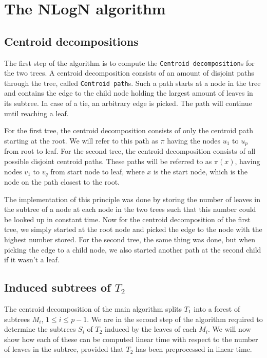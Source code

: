 \chapter{The NLogN algorithm}

\section{Centroid decompositions}
The first step of the algorithm is to compute the \texttt{Centroid decomposition}s for the two trees. A centroid decomposition consists of an amount of disjoint paths through the tree, called \texttt{Centroid path}s. Such a path starts at a node in the tree and contains the edge to the child node holding the largest amount of leaves in its subtree. In case of a tie, an arbitrary edge is picked. The path will continue until reaching a leaf.

For the first tree, the centroid decomposition consists of only the centroid path starting at the root. We will refer to this path as $\pi$ having the nodes $u_1$ to $u_p$ from root to leaf. For the second tree, the centroid decomposition consists of all possible disjoint centroid paths. These paths will be referred to as $\pi(x)$, having nodes $v_1$ to $v_q$ from start node to leaf, where $x$ is the start node, which is the node on the path closest to the root.

The implementation of this principle was done by storing the number of leaves in the subtree of a node at each node in the two trees such that this number could be looked up in constant time. Now for the centroid decomposition of the first tree, we simply started at the root node and picked the edge to the node with the highest number stored. For the second tree, the same thing was done, but when picking the edge to a child node, we also started another path at the second child if it wasn't a leaf.

\section{Induced subtrees of $T_2$}
The centroid decomposition of the main algorithm splits $T_1$ into a forest of subtrees $M_i$, $1 \le i \le p-1$. We are in the second step of the algorithm required to determine the subtrees $S_i$ of $T_2$ induced by the leaves of each $M_i$.
We will now show how each of these can be computed linear time with respect to the number of leaves in the subtree, provided that $T_2$ has been preprocessed in linear time.

